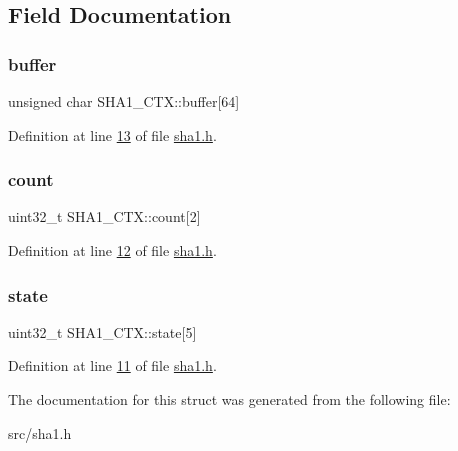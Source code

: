 \subsection{Field Documentation}
\mbox{\label{structSHA1__CTX_a90100b1aab0fedb1d72ded66abeeffe2}} 
\subsubsection{\texorpdfstring{buffer}{buffer}}
{\footnotesize\ttfamily unsigned char S\+H\+A1\+\_\+\+C\+T\+X\+::buffer\mbox{[}64\mbox{]}}



Definition at line \hyperlink{sha1_8h_source_l00013}{13} of file \hyperlink{sha1_8h_source}{sha1.\+h}.

\mbox{\label{structSHA1__CTX_a7db1dac8c2309a5b22f1cf4bc5de96a5}} 
\subsubsection{\texorpdfstring{count}{count}}
{\footnotesize\ttfamily uint32\+\_\+t S\+H\+A1\+\_\+\+C\+T\+X\+::count\mbox{[}2\mbox{]}}



Definition at line \hyperlink{sha1_8h_source_l00012}{12} of file \hyperlink{sha1_8h_source}{sha1.\+h}.

\mbox{\label{structSHA1__CTX_a81d7f6018258ee84f001284c6ff9d2d5}} 
\subsubsection{\texorpdfstring{state}{state}}
{\footnotesize\ttfamily uint32\+\_\+t S\+H\+A1\+\_\+\+C\+T\+X\+::state\mbox{[}5\mbox{]}}



Definition at line \hyperlink{sha1_8h_source_l00011}{11} of file \hyperlink{sha1_8h_source}{sha1.\+h}.



The documentation for this struct was generated from the following file\+:\begin{DoxyCompactItemize}
\item 
src/sha1.\+h\end{DoxyCompactItemize}
